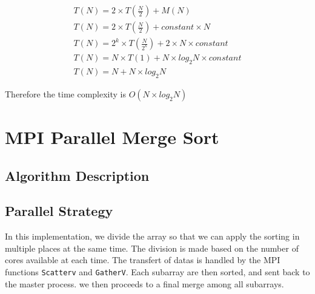 \documentclass[12pt]{article}
\begin{document}
\begin{gather}
  T(N) = 2 \times T(\frac{N}{2}) + M(N) \\
  T(N) = 2 \times T(\frac{N}{2}) + constant \times N \\
  T(N) = 2^k \times T(\frac{N}{2^k}) + 2 \times N \times constant \\
  T(N) = N \times T(1) + N \times log_2N \times constant \\
  T(N) = N + N \times log_2N
\end{gather}

Therefore the time complexity is \textbf{\(O(N \times log_2N)\)}

\section{MPI Parallel Merge Sort}

\subsection{Algorithm Description}
\noindent{}

\subsection{Parallel Strategy}
In this implementation, we divide the array so that we can apply the sorting in multiple places at the same time.
The division is made based on the number of cores available at each time.
The transfert of datas is handled by the MPI functions \texttt{Scatterv} and \texttt{GatherV}.
Each subarray are then sorted, and sent back to the master process.
we then proceeds to a final merge among all subarrays.
\end{document}
